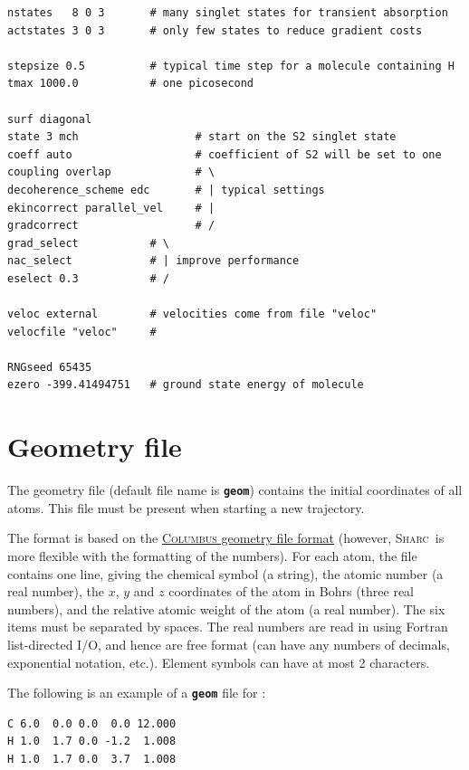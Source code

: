 \documentclass[a4paper,10pt,DIV=15,openany]{scrbook}
\newcommand{\link}[2]{\href{#1}{#2}}
\newcommand{\sharc}{\textsc{Sharc}}
\newcommand{\ttt}[1]{\textbf{\texttt{#1}}}
\newenvironment{example}{
  \setlength{\OuterFrameSep}{3pt}
  \vspace{0mm}
  \definecolor{shadecolor}{HTML}{E4F4FF}
  \begin{shaded}
}{
  \end{shaded}
}
\begin{document}
\begin{example}
  \begin{verbatim}
nstates   8 0 3       # many singlet states for transient absorption
actstates 3 0 3       # only few states to reduce gradient costs

stepsize 0.5          # typical time step for a molecule containing H
tmax 1000.0           # one picosecond

surf diagonal
state 3 mch                  # start on the S2 singlet state
coeff auto                   # coefficient of S2 will be set to one
coupling overlap             # \
decoherence_scheme edc       # | typical settings
ekincorrect parallel_vel     # |
gradcorrect                  # /
grad_select           # \
nac_select            # | improve performance
eselect 0.3           # /

veloc external        # velocities come from file "veloc"
velocfile "veloc"     #

RNGseed 65435
ezero -399.41494751   # ground state energy of molecule
\end{verbatim}
\end{example}



\section{Geometry file}\label{sec:geomfile}

The geometry file (default file name is \ttt{geom}) contains the initial coordinates of all atoms. This file must be present when starting a new trajectory.

The format is based on the \link{http://www.univie.ac.at/columbus/docs_COL70/documentation_main.html}{\textsc{Columbus} geometry file format} (however, \sharc\ is more flexible with the formatting of the numbers). For each atom, the file contains one line, giving the chemical symbol (a string), the atomic number (a real number), the $x$, $y$ and $z$ coordinates of the atom in Bohrs (three real numbers), and the relative atomic weight of the atom (a real number). The six items must be separated by spaces. The real numbers are read in using Fortran list-directed I/O, and hence are free format (can have any numbers of decimals, exponential notation, etc.). Element symbols can have at most 2 characters.

The following is an example of a \ttt{geom} file for \ce{CH2}:
\begin{example}
  \begin{verbatim}
C 6.0  0.0 0.0  0.0 12.000
H 1.0  1.7 0.0 -1.2  1.008
H 1.0  1.7 0.0  3.7  1.008
\end{verbatim}
\end{example}
\end{document}
